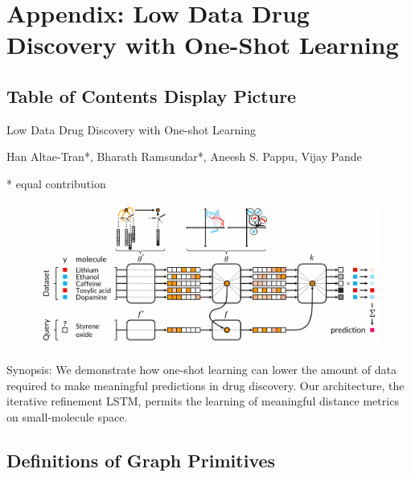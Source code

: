\section{Appendix: Low Data Drug Discovery with One-Shot Learning}

\newpage
\subsection*{Table of Contents Display Picture}
{\huge \centering Low Data Drug Discovery with One-shot Learning}

{\Large Han Altae-Tran*, Bharath Ramsundar*, Aneesh S. Pappu, Vijay Pande}

* equal contribution

\begin{figure}[H]
\includegraphics{Images/For_Table_Of_Contents_Only.png}
\end{figure}

Synopsis: We demonstrate how one-shot learning can lower the amount of data required to make meaningful predictions in drug discovery. Our architecture, the iterative refinement LSTM, permits the learning of meaningful distance metrics on small-molecule space.


\subsection{Definitions of Graph Primitives}

